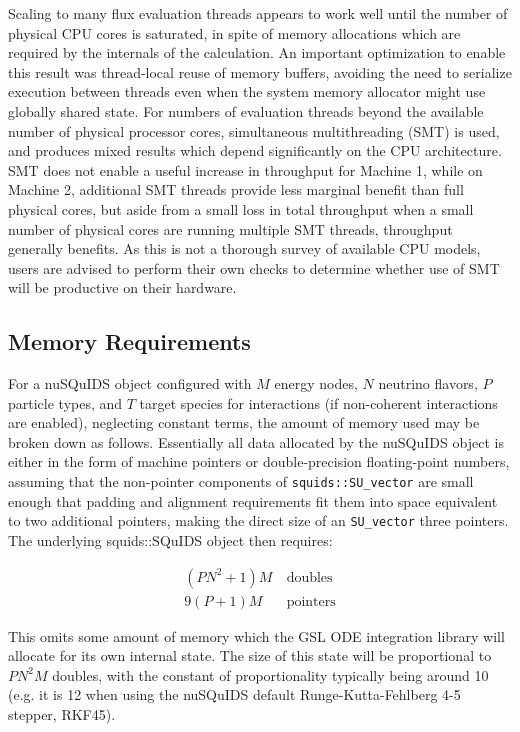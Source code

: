 \documentclass[3p,12pt]{elsarticle}
\newcommand{\ttf}{\ttfamily}
\begin{document}
Scaling to many flux evaluation threads appears to work well until the number of physical CPU cores is saturated, in spite of memory allocations which are required by the internals of the calculation. 
An important optimization to enable this result was thread-local reuse of memory buffers, avoiding the need to serialize execution between threads even when the system memory allocator might use globally shared state. 
For numbers of evaluation threads beyond the available number of physical processor cores, simultaneous multithreading (SMT) is used, and produces mixed results which depend significantly on the CPU architecture. 
SMT does not enable a useful increase in throughput for Machine 1, while on Machine 2, additional SMT threads provide less marginal benefit than full physical cores, but aside from a small loss in total throughput when a small number of physical cores are running multiple SMT threads, throughput generally benefits. 
As this is not a thorough survey of available CPU models, users are advised to perform their own checks to determine whether use of SMT will be productive on their hardware. 

\subsection{Memory Requirements}
\label{ssec:memory}

For a {\ttf nuSQuIDS} object configured with $M$ energy nodes, $N$ neutrino flavors, $P$ particle types, and $T$ target species for interactions (if non-coherent interactions are enabled), neglecting constant terms, the amount of memory used may be broken down as follows. 
Essentially all data allocated by the {\ttf nuSQuIDS} object is either in the form of machine pointers or double-precision floating-point numbers, assuming that the non-pointer components of \lstinline{squids::SU_vector} are small enough that padding and alignment requirements fit them into space equivalent to two additional pointers, making the direct size of an \lstinline{SU_vector} three pointers. 
The underlying {\ttf squids::SQuIDS} object then requires:

\begin{subequations}
\label{eq:squids_memory}
\begin{align}
(PN^2 + 1)M &~\textrm{doubles}\\
9(P+1)M &~\textrm{pointers}
\end{align}
\end{subequations}

This omits some amount of memory which the GSL ODE integration library will allocate for its own internal state. 
The size of this state will be proportional to $PN^2M$ doubles, with the constant of proportionality typically being around 10 (e.g. it is 12 when using the {\ttf nuSQuIDS} default Runge-Kutta-Fehlberg 4-5 stepper, RKF45). 
\end{document}
